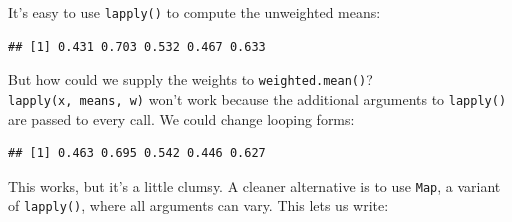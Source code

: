 \begin{Shaded}
\begin{Highlighting}[]
\StringTok{ }\NormalTok{(}\NormalTok{, }\NormalTok{(}\NormalTok{), } \NormalTok{)}
\StringTok{ }\NormalTok{(}\NormalTok{, }\NormalTok{(}\NormalTok{, }\NormalTok{) }\OperatorTok{+}\StringTok{ }\NormalTok{, } \NormalTok{)}
\end{Highlighting}
\end{Shaded}

It's easy to use \texttt{lapply()} to compute the unweighted means:

\begin{Shaded}
\begin{Highlighting}[]
\NormalTok{(}
\end{Highlighting}
\end{Shaded}

\begin{verbatim}
## [1] 0.431 0.703 0.532 0.467 0.633
\end{verbatim}

But how could we supply the weights to \texttt{weighted.mean()}?
\texttt{lapply(x,\ means,\ w)} won't work because the additional
arguments to \texttt{lapply()} are passed to every call. We could change
looping forms:

\begin{Shaded}
\begin{Highlighting}[]
\NormalTok{(}\NormalTok{(}
\NormalTok{\}))}
\end{Highlighting}
\end{Shaded}

\begin{verbatim}
## [1] 0.463 0.695 0.542 0.446 0.627
\end{verbatim}

This works, but it's a little clumsy. A cleaner alternative is to use
\texttt{Map}, a variant of \texttt{lapply()}, where all arguments can
vary. This lets us write:

